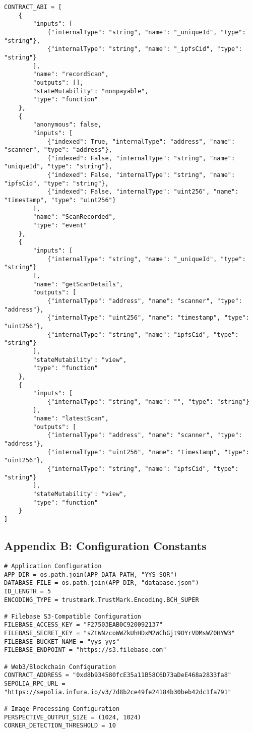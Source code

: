 \documentclass[12pt,a4paper]{article}
\begin{document}
\begin{lstlisting}[caption=Complete Smart Contract ABI]
CONTRACT_ABI = [
    {
        "inputs": [
            {"internalType": "string", "name": "_uniqueId", "type": "string"},
            {"internalType": "string", "name": "_ipfsCid", "type": "string"}
        ],
        "name": "recordScan",
        "outputs": [],
        "stateMutability": "nonpayable",
        "type": "function"
    },
    {
        "anonymous": false,
        "inputs": [
            {"indexed": True, "internalType": "address", "name": "scanner", "type": "address"},
            {"indexed": False, "internalType": "string", "name": "uniqueId", "type": "string"},
            {"indexed": False, "internalType": "string", "name": "ipfsCid", "type": "string"},
            {"indexed": False, "internalType": "uint256", "name": "timestamp", "type": "uint256"}
        ],
        "name": "ScanRecorded",
        "type": "event"
    },
    {
        "inputs": [
            {"internalType": "string", "name": "_uniqueId", "type": "string"}
        ],
        "name": "getScanDetails",
        "outputs": [
            {"internalType": "address", "name": "scanner", "type": "address"},
            {"internalType": "uint256", "name": "timestamp", "type": "uint256"},
            {"internalType": "string", "name": "ipfsCid", "type": "string"}
        ],
        "stateMutability": "view",
        "type": "function"
    },
    {
        "inputs": [
            {"internalType": "string", "name": "", "type": "string"}
        ],
        "name": "latestScan",
        "outputs": [
            {"internalType": "address", "name": "scanner", "type": "address"},
            {"internalType": "uint256", "name": "timestamp", "type": "uint256"},
            {"internalType": "string", "name": "ipfsCid", "type": "string"}
        ],
        "stateMutability": "view",
        "type": "function"
    }
]
\end{lstlisting}

\subsection{Appendix B: Configuration Constants}

\begin{lstlisting}[caption=System Configuration Constants]
# Application Configuration
APP_DIR = os.path.join(APP_DATA_PATH, "YYS-SQR")
DATABASE_FILE = os.path.join(APP_DIR, "database.json")
ID_LENGTH = 5
ENCODING_TYPE = trustmark.TrustMark.Encoding.BCH_SUPER

# Filebase S3-Compatible Configuration
FILEBASE_ACCESS_KEY = "F27503EAB0C920092137"
FILEBASE_SECRET_KEY = "sZtWNzcoWWZkUhHDxM2WChGjt9OYrVDMsWZ0HYW3"
FILEBASE_BUCKET_NAME = "yys-yys"
FILEBASE_ENDPOINT = "https://s3.filebase.com"

# Web3/Blockchain Configuration
CONTRACT_ADDRESS = "0xd8b934580fcE35a11B58C6D73aDeE468a2833fa8"
SEPOLIA_RPC_URL = "https://sepolia.infura.io/v3/7d8b2ce49fe24184b30beb42dc1fa791"

# Image Processing Configuration
PERSPECTIVE_OUTPUT_SIZE = (1024, 1024)
CORNER_DETECTION_THRESHOLD = 10
\end{lstlisting}
\end{document}
